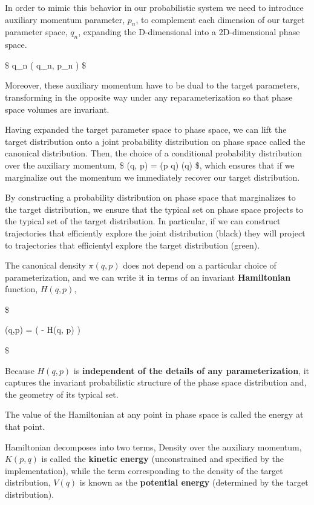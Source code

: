 \documentclass[
]{book}
\begin{document}
In order to mimic this behavior in our probabilistic system we need to introduce auxiliary momentum parameter, \(p_n\), to complement each dimension of our target parameter space, \(q_n\), expanding the D-dimensional into a 2D-dimensional phase space.

\$
q\_n \rightarrow \left( q\_n, p\_n \right)
\$

Moreover, these auxiliary momentum have to be dual to the target parameters, transforming in the opposite way under any reparameterization so that phase space volumes are invariant.

Having expanded the target parameter space to phase space, we can lift the target distribution onto a joint probability distribution on phase space called the canonical distribution. Then, the choice of a conditional probability distribution over the auxiliary momentum, \$ \pi(q, p) = \pi(p \vert q) \pi(q) \$, which ensures that if we marginalize out the momentum we immediately recover our target distribution.

By constructing a probability distribution on phase space that marginalizes to the target distribution, we ensure that the typical set on phase space projects to the typical set of the target distribution. In particular, if we can construct trajectories that efficiently explore the joint distribution (black) they will project to trajectories that efficientyl explore the target distribution (green).

The canonical density \(\pi(q, p)\) does not depend on a particular choice of parameterization, and we can write it in terms of an invariant \textbf{Hamiltonian} function, \(H(q, p)\),

\$

\pi(q,p) = \exp \left( - H(q, p) \right)

\$

Because \(H(q, p)\) is \textbf{independent of the details of any parameterization}, it captures the invariant probabilistic structure of the phase space distribution and, the geometry of its typical set.

The value of the Hamiltonian at any point in phase space is called the energy at that point.

Hamiltonian decomposes into two terms, Density over the auxiliary momentum, \(K(p,q)\) is called the \textbf{kinetic energy} (unconstrained and specified by the implementation), while the term corresponding to the density of the target distribution, \(V(q)\) is known as the \textbf{potential energy} (determined by the target distribution).
\end{document}
